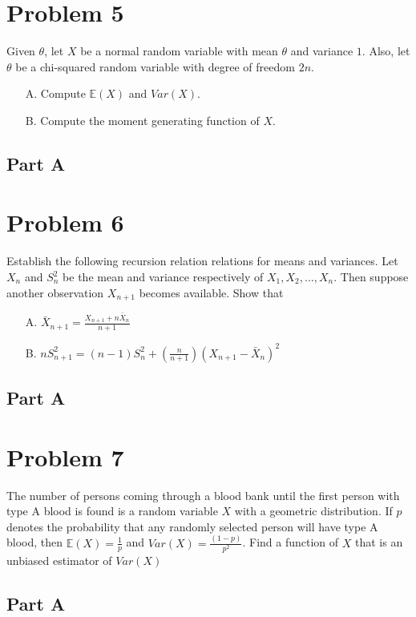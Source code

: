 \documentclass{article}
\begin{document}
\section*{Problem 5}
Given $\theta$, let $X$ be a normal random variable with mean $\theta$ and variance $1$. Also, let
$\theta$ be a chi-squared random variable with degree of freedom $2n$.
\begin{enumerate}
\item[A.] Compute $\mathbb{E}(X)$ and $Var(X)$.
\item[B.] Compute the moment generating function of $X$.
\end{enumerate}
\subsection*{Part A}
    
\clearpage
\section*{Problem 6}
Establish the following recursion relation relations for means and variances. Let $X_n$ and $S_n^2$ be the mean and variance respectively of $X_1,X_2,...,X_n$. Then suppose another observation $X_{n+1}$ becomes available. Show that
\begin{enumerate}
\item[A.] $\bar{X}_{n+1} = \frac{X_{n+1}+n \bar{X}_n}{n+1}$
\item[B.] $nS^2_{n+1} = (n-1)S^2_n + (\tfrac{n}{n+1})(X_{n+1}-\bar{X}_n)^2$
\end{enumerate}
\subsection*{Part A}

    
\clearpage
\section*{Problem 7}
The number of persons coming through a blood bank until the first person with
type A blood is found is a random variable $X$ with a geometric distribution. If $p$ denotes the
probability that any randomly selected person will have type A blood, then $\mathbb{E}(X) = \tfrac{1}{p}$ and $Var(X)=\tfrac{(1-p)}{p^2}$. Find a function of $X$ that is an unbiased estimator of $Var(X)$ 
\subsection*{Part A}
    
\clearpage
\end{document}
